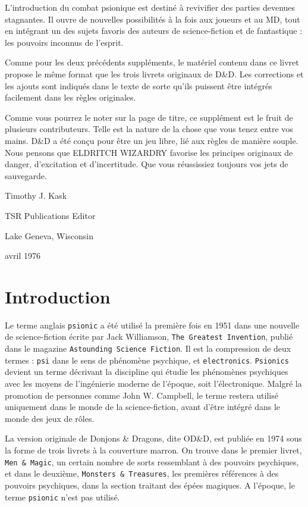 \documentclass[11pt]{article}
\begin{document}
L'introduction du combat psionique est destiné à revivifier des parties devenues stagnantes. Il ouvre de nouvelles possibilités à la fois aux joueurs et au MD, tout en intégrant un des sujets favoris des auteurs de science-fiction et de fantastique : les pouvoirs inconnus de l'esprit.

Comme pour les deux précédents suppléments, le matériel contenu dans ce livret propose le même format que les trois livrets originaux de D\&D. Les corrections et les ajouts sont indiqués dans le texte de sorte qu'ils puissent être intégrés facilement dans les règles originales.

Comme vous pourrez le noter sur la page de titre, ce supplément est le fruit de plusieurs contributeurs. Telle est la nature de la chose que vous tenez entre vos mains. D\&D a été conçu pour être un jeu libre, lié aux règles de manière souple. Nous pensons que ELDRITCH WIZARDRY favorise les principes originaux de danger, d'excitation et d'incertitude. Que vous réussissiez toujours vos jets de sauvegarde.

\vspace{1cm}

\noindent Timothy J. Kask

\noindent TSR Publications Editor

\noindent Lake Geneva, Wisconsin

 avril 1976

\newpage

\section*{Introduction}

Le terme anglais \texttt{psionic} a été utilisé la première fois en 1951 dans une nouvelle de science-fiction écrite par Jack Williamson, \texttt{The Greatest Invention}, publié dans le magazine \texttt{Astounding Science Fiction}. Il est la compression de deux termes : \texttt{psi} dans le sens de phénomène psychique, et \texttt{electronics}. \texttt{Psionics} devient un terme décrivant la discipline qui étudie les phénomènes psychiques avec les moyens de l'ingénierie moderne de l'époque, soit l'électronique. Malgré la promotion de personnes comme John W. Campbell, le terme restera utilisé uniquement dans le monde de la science-fiction, avant d'être intégré dans le monde des jeux de rôles.

La version originale de Donjons \& Dragons, dite OD\&D, est publiée en 1974 sous la forme de trois livrets à la couverture marron. On trouve dans le premier livret, \texttt{Men \& Magic}, un certain nombre de sorts ressemblant à des pouvoirs psychiques, et dans le deuxième, \texttt{Monsters \& Treasures}, les premières références à des pouvoirs psychiques, dans la section traitant des épées magiques. A l'époque, le terme \texttt{psionic} n'est pas utilisé.
\end{document}

